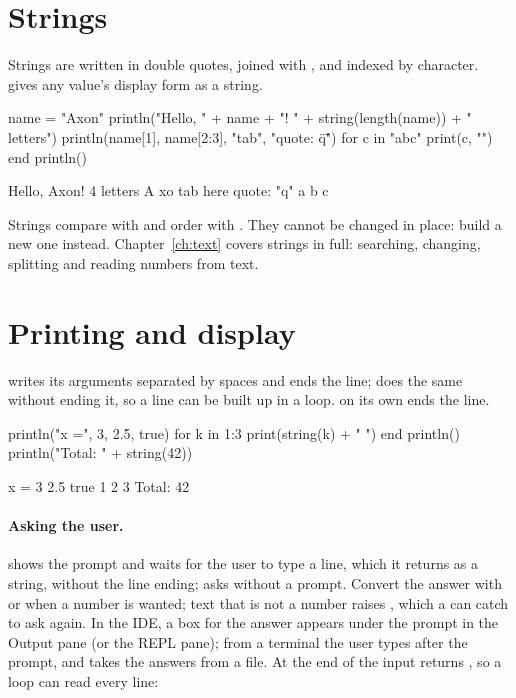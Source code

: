 \documentclass[11pt,a4paper,openany]{report}
\begin{document}
{{\section{Strings}

Strings are written in double quotes, joined with \code{+}, and indexed by
character.  gives any value's display form as a string.

\begin{axon}
name = "Axon"
println("Hello, " + name + "! " + string(length(name)) + " letters")
println(name[1], name[2:3], "tab\there", "quote: \"q\"")
for c in "abc"
  print(c, "")
end
println()
\end{axon}
\begin{axonout}
Hello, Axon! 4 letters
A xo tab	here quote: "q"
a b c
\end{axonout}

Strings compare with \code{==} and order with \code{<}. They cannot be changed
in place: build a new one instead. Chapter~\ref{ch:text} covers strings in
full: searching, changing, splitting and reading numbers from text.

\section{Printing and display}\label{sec:printing}

 writes its arguments separated by spaces and ends the
line;  does the same without ending it, so a line can be built up in
a loop.  on its own ends the line.

\begin{axon}
println("x =", 3, 2.5, true)
for k in 1:3
  print(string(k) + " ")
end
println()
println("Total: " + string(42))
\end{axon}
\begin{axonout}
x = 3 2.5 true
1 2 3
Total: 42
\end{axonout}

\paragraph{Asking the user.}  shows the prompt and waits
for the user to type a line, which it returns as a string, without the line
ending;  asks without a prompt. Convert the answer with
 or  when a number is wanted; text that is not a number
raises , which a  can catch to ask again. In the
IDE, a box for the answer appears under the prompt in the Output pane (or the
REPL pane); from a terminal the user types after the prompt, and
 takes the answers from a file. At the end of
the input  returns , so a loop can read every line:

}}
\end{document}
